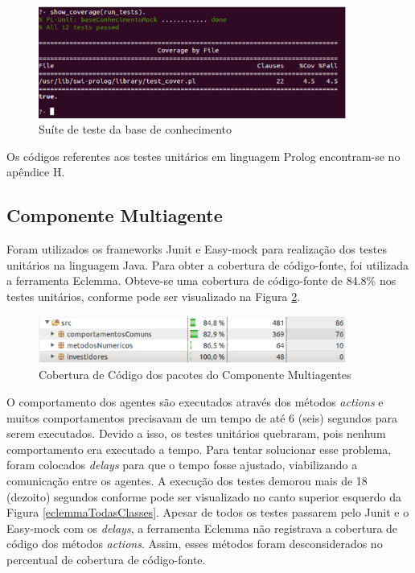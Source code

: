 \begin{figure}[H]
\centering
\includegraphics[width=0.9\textwidth]{figuras/prologTeste2}
\caption{Suíte de teste da base de conhecimento}
\label{prologTeste2}
\end{figure}

Os códigos referentes aos testes unitários em linguagem Prolog encontram-se no apêndice H.

\subsection{Componente Multiagente}
Foram utilizados os frameworks Junit e Easy-mock para realização dos testes unitários na linguagem Java. Para obter a cobertura de código-fonte, foi utilizada a ferramenta Eclemma. Obteve-se uma cobertura de código-fonte de 84.8\% nos testes unitários, conforme pode ser visualizado na Figura \ref{eclemmaSMA}. 

\begin{figure}[H]
\centering
\includegraphics[width=0.9\textwidth]{figuras/eclemmaSMA}
\caption{Cobertura de Código dos pacotes do Componente Multiagentes}
\label{eclemmaSMA}
\end{figure}

O comportamento dos agentes são executados através dos métodos \textit{actions} e muitos  comportamentos precisavam de um tempo de até 6 (seis) segundos para serem executados. Devido a isso, os testes unitários quebraram, pois nenhum comportamento era executado a tempo. Para tentar solucionar esse problema, foram colocados \textit{delays} para que o tempo fosse ajustado, viabilizando a comunicação entre os agentes. A execução dos testes demorou mais de 18 (dezoito) segundos conforme pode ser visualizado no  canto superior esquerdo da Figura \ref{eclemmaTodasClasses}. Apesar de todos os testes passarem pelo Junit e o Easy-mock com os \textit{delays}, a ferramenta Eclemma não registrava a cobertura de código dos métodos \textit{actions}. Assim, esses métodos foram desconsiderados no percentual de cobertura de código-fonte.

